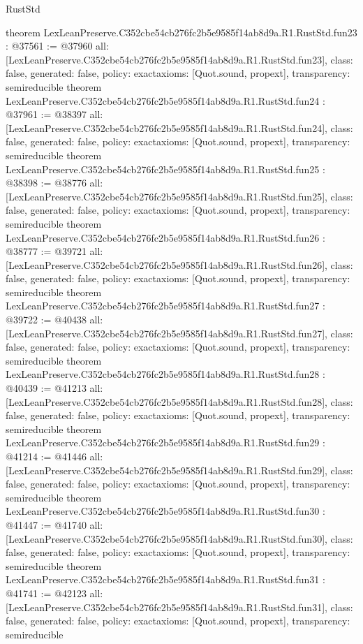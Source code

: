 \begin{lexlean}{RustStd}
\begin{coremodule}
{}
theorem LexLeanPreserve.C352cbe54cb276fc2b5e9585f14ab8d9a.R1.RustStd.fun23 : @37561 := @37960 {
  all: [LexLeanPreserve.C352cbe54cb276fc2b5e9585f14ab8d9a.R1.RustStd.fun23],
  class: false,
  generated: false,
  policy: exact{axioms: [Quot.sound, propext]},
  transparency: semireducible
}
theorem LexLeanPreserve.C352cbe54cb276fc2b5e9585f14ab8d9a.R1.RustStd.fun24 : @37961 := @38397 {
  all: [LexLeanPreserve.C352cbe54cb276fc2b5e9585f14ab8d9a.R1.RustStd.fun24],
  class: false,
  generated: false,
  policy: exact{axioms: [Quot.sound, propext]},
  transparency: semireducible
}
theorem LexLeanPreserve.C352cbe54cb276fc2b5e9585f14ab8d9a.R1.RustStd.fun25 : @38398 := @38776 {
  all: [LexLeanPreserve.C352cbe54cb276fc2b5e9585f14ab8d9a.R1.RustStd.fun25],
  class: false,
  generated: false,
  policy: exact{axioms: [Quot.sound, propext]},
  transparency: semireducible
}
theorem LexLeanPreserve.C352cbe54cb276fc2b5e9585f14ab8d9a.R1.RustStd.fun26 : @38777 := @39721 {
  all: [LexLeanPreserve.C352cbe54cb276fc2b5e9585f14ab8d9a.R1.RustStd.fun26],
  class: false,
  generated: false,
  policy: exact{axioms: [Quot.sound, propext]},
  transparency: semireducible
}
theorem LexLeanPreserve.C352cbe54cb276fc2b5e9585f14ab8d9a.R1.RustStd.fun27 : @39722 := @40438 {
  all: [LexLeanPreserve.C352cbe54cb276fc2b5e9585f14ab8d9a.R1.RustStd.fun27],
  class: false,
  generated: false,
  policy: exact{axioms: [Quot.sound, propext]},
  transparency: semireducible
}
theorem LexLeanPreserve.C352cbe54cb276fc2b5e9585f14ab8d9a.R1.RustStd.fun28 : @40439 := @41213 {
  all: [LexLeanPreserve.C352cbe54cb276fc2b5e9585f14ab8d9a.R1.RustStd.fun28],
  class: false,
  generated: false,
  policy: exact{axioms: [Quot.sound, propext]},
  transparency: semireducible
}
theorem LexLeanPreserve.C352cbe54cb276fc2b5e9585f14ab8d9a.R1.RustStd.fun29 : @41214 := @41446 {
  all: [LexLeanPreserve.C352cbe54cb276fc2b5e9585f14ab8d9a.R1.RustStd.fun29],
  class: false,
  generated: false,
  policy: exact{axioms: [Quot.sound, propext]},
  transparency: semireducible
}
theorem LexLeanPreserve.C352cbe54cb276fc2b5e9585f14ab8d9a.R1.RustStd.fun30 : @41447 := @41740 {
  all: [LexLeanPreserve.C352cbe54cb276fc2b5e9585f14ab8d9a.R1.RustStd.fun30],
  class: false,
  generated: false,
  policy: exact{axioms: [Quot.sound, propext]},
  transparency: semireducible
}
theorem LexLeanPreserve.C352cbe54cb276fc2b5e9585f14ab8d9a.R1.RustStd.fun31 : @41741 := @42123 {
  all: [LexLeanPreserve.C352cbe54cb276fc2b5e9585f14ab8d9a.R1.RustStd.fun31],
  class: false,
  generated: false,
  policy: exact{axioms: [Quot.sound, propext]},
  transparency: semireducible
}
\end{coremodule}
\end{lexlean}
